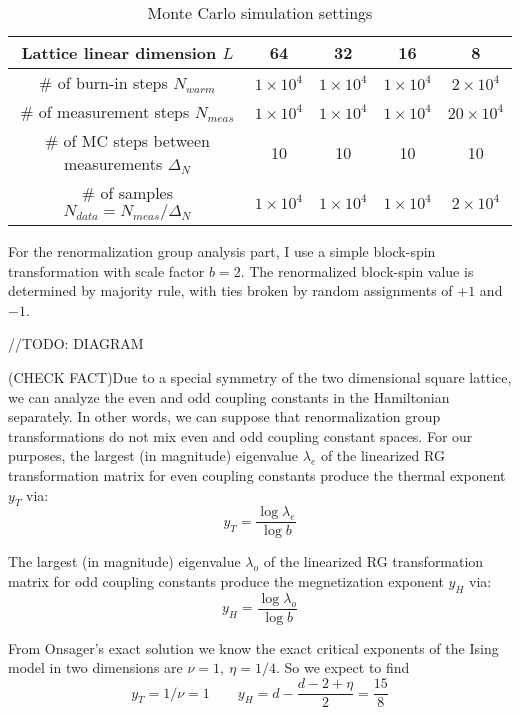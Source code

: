 \documentclass{article}
\begin{document}
\begin{table}[H]
\centering
\begin{tabular}{|c|c|c|c|c|} 
 \hline
 Lattice linear dimension $L$ & 64 & 32 & 16 & 8 \\ 
 \hline
 \# of burn-in steps $N_{warm}$ & $1\times 10^4$& $1\times 10^4$& $1\times 10^4$& $2\times 10^4$ \\ 
 \hline
 \# of measurement steps $N_{meas}$& $1\times 10^4$& $1\times 10^4$& $1\times 10^4$& $20\times 10^4$\\
 \hline
 \# of MC steps between measurements $\Delta_N$ & 10 & 10 & 10 & 10 \\
 \hline
 \# of samples $N_{data} = N_{meas}/\Delta_{N}$ & $1\times 10^4$& $1\times 10^4$& $1\times 10^4$& $2\times 10^4$ \\
 \hline
 \end{tabular}
 \caption{\label{MCSettings}Monte Carlo simulation settings}
\end{table}

For the renormalization group analysis part, I use a simple block-spin transformation with scale factor $b = 2$. The renormalized block-spin value is determined by majority rule, with ties broken by random assignments of $+1$ and $-1$.  

//TODO: DIAGRAM

(CHECK FACT)Due to a special symmetry of the two dimensional square lattice, we can analyze the even and odd coupling constants in the Hamiltonian separately. In other words, we can suppose that renormalization group transformations do not mix even and odd coupling constant spaces. For our purposes, the largest (in magnitude) eigenvalue $\lambda_e$ of the linearized RG transformation matrix for even coupling constants produce the thermal exponent $y_T$ via:
\begin{equation*}
y_T = \frac{\log \lambda_e}{\log b}
\end{equation*}

The largest (in magnitude) eigenvalue $\lambda_o$ of the linearized RG transformation matrix for odd coupling constants produce the megnetization exponent $y_H$ via:
\begin{equation*}
y_H = \frac{\log \lambda_o}{\log b}
\end{equation*}

From Onsager's exact solution \cite{Onsager1944} we know the exact critical exponents of the Ising model in two dimensions are $\nu = 1 ,\  \eta = 1/4$. So we expect to find
\begin{equation*}
y_T = 1/\nu = 1 \qquad y_H = d-\frac{d-2+\eta}{2}= \frac{15}{8}
\end{equation*}
\end{document}
